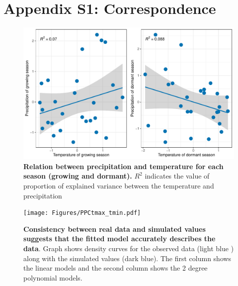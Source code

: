 \documentclass[11pt]{article}\usepackage[]{graphicx}\usepackage[usenames,dvipsnames]{xcolor}
\begin{document}
\section*{Appendix S1: Correspondence }
\renewcommand{\thefigure}{A\arabic{figure}}\setcounter{figure}{0}
\renewcommand{\thetable}{A\arabic{table}}\setcounter{table}{0}
\renewcommand{\theequation}{A\arabic{equation}}\setcounter{equation}{0}
	\begin{figure}[H]
		\centering
		\includegraphics[width = \linewidth]{Figures/Varianceexplained.pdf}
		\caption{\textbf{Relation between precipitation and temperature for each season (growing and dormant).} $R^2$ indicates the value of proportion of explained variance between the temperature and precipitation}
	\end{figure}
	
  \begin{figure}[H]
		\centering
		\texttt{[image: Figures/PPCtmax\_tmin.pdf]}
		\caption{\textbf{Consistency between real data and simulated values suggests that the fitted model accurately describes the data}. Graph shows density curves for the observed data (light blue ) along with the simulated values (dark blue). The first column shows the linear models and the second column shows the 2 degree polynomial models.}
	\end{figure}
	
\end{document}
